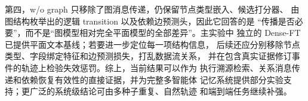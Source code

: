第四，w/o graph 只移除了图消息传递，仍保留节点类型嵌入、候选打分器、
由图结构枚举出的逻辑 transition 以及依赖边预测头，因此它回答的是
“传播是否必要”，而不是“图模型相对完全平面模型的全部差异”。主实验中
独立的 Dense-FT 已提供平面文本基线；若要进一步定位每一项结构信息，
后续还应分别移除节点类型、字段绑定特征和边预测损失，打乱数据流关系，
并在包含真实证据修订事件的轨迹上检验失效惩罚。综上，当前结果可以作为
执行溯源检索、关系消息传递和依赖恢复有效性的直接证据，并为完整多智能体
记忆系统提供部分实验支持；更广泛的系统级结论可由多种子重复、自然轨迹
和端到端任务继续补强。
